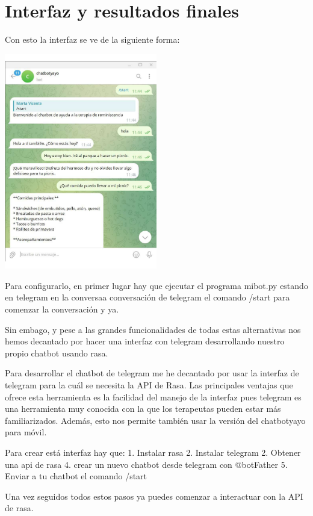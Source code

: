 \chapter{Interfaz y resultados finales}
\label{cap:Interfaz y resultados finales}

Con esto la interfaz se ve de la siguiente forma: 

\includegraphics[width=0.5\textwidth]{Imagenes/telegram1}

Para configurarlo, en primer lugar hay que ejecutar el programa mibot.py estando en telegram en la conversaa conversación de telegram el comando /start para comenzar la conversación y ya. 

Sin embago, y pese a las grandes funcionalidades de todas estas alternativas nos hemos decantado por hacer una interfaz con telegram desarrollando nuestro propio chatbot usando rasa. 

Para desarrollar el chatbot de telegram me he decantado por usar la interfaz de telegram para la cuál se necesita la API de Rasa. Las principales ventajas que ofrece esta herramienta es la facilidad del manejo de la interfaz pues telegram es una herramienta muy conocida con la que los terapeutas pueden estar más familiarizados. Además, esto nos permite también usar la versión del chatbotyayo para móvil. 

Para crear está interfaz hay que: 
1. Instalar rasa
2. Instalar telegram 
2. Obtener una api de rasa
4. crear un nuevo chatbot desde telegram con @botFather
5. Enviar a tu chatbot el comando /start

Una vez seguidos todos estos pasos ya puedes comenzar a interactuar con la API de rasa. 


